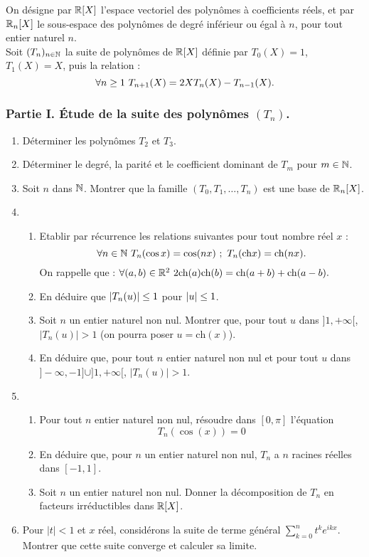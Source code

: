  On désigne par $\mathbb{R}[X]$ l'espace vectoriel des
polynômes à coefficients réels, et par $\mathbb{R}_n[X]$ le sous-espace  des
polynômes
de degré inférieur ou égal à $n$, pour tout entier naturel $n$.\\
Soit $(T_n)_{n\in\mathbb{N}}$  la suite de polynômes de $\mathbb{R}[X]$ définie par
$T_0(X)=1$, $T_1(X)=X$, puis la relation :
$$\forall n\se 1\ T_{n+1}(X)=2XT_n(X)-T_{n-1}(X).$$

\subsubsection*{Partie I. \'{E}tude de la suite des polynômes $(T_n)$.}

\begin{enumerate}
\item Déterminer les polynômes $T_2$ et $T_3$.
\item Déterminer le degré, la parité et le coefficient dominant de
$T_m$ pour $m\in\mathbb{N}$.
\item Soit $n$ dans $\mathbb{N}$. Montrer que la famille
$(T_0,T_1,\dots,T_n)$ est une base de $\mathbb{R}_n[X]$.
\item
\begin{enumerate}
  \item Etablir par récurrence les relations suivantes pour tout
  nombre réel $x$ :
  $$\forall n\in\N\ T_n(\cos x)=\cos(nx)\ ;\ T_n(\textrm{ch}
  x)=\textrm{ch}(nx).$$
  On rappelle que : $\forall (a,b)\in\mathbb{R}^2\
  2\textrm{ch}(a)\textrm{ch}(b)=\textrm{ch}(a+b)+\textrm{ch}(a-b).$
  \item En déduire que $|T_n(u)|\leq 1$ pour $|u|\leq 1$.
  \item Soit $n$ un entier naturel non nul. Montrer que, pour tout $u$ dans
  $]1,+\infty[$, $|T_n(u)|>1$ (on pourra poser $u=\textrm{ch}(x)$).
  \item En déduire que, pour tout $n$ entier naturel non nul et pour
  tout $u$ dans \\$ ]-\infty, -1]\cup]1,+\infty[$, $|T_n(u)|>1$.
\end{enumerate}
\item \begin{enumerate}
        \item Pour tout $n$ entier naturel non nul, résoudre dans $[0,\pi]$ l'équation
\begin{displaymath}
  T_n(\cos(x))=0
\end{displaymath}
        \item En déduire que, pour $n$ un entier naturel non nul, $T_n$ a $n$
        racines réelles dans $[-1,1]$.
        \item Soit $n$ un entier naturel non nul. Donner la décomposition de
        $T_n$ en facteurs irréductibles dans $\mathbb{R}[X]$.
      \end{enumerate}
\item Pour $|t|<1$ et $x$ réel, considérons la suite de terme général $\sum_{k=0}^n
t^k e^{ikx}$. Montrer que cette suite converge et calculer sa
limite.
\end{enumerate}



